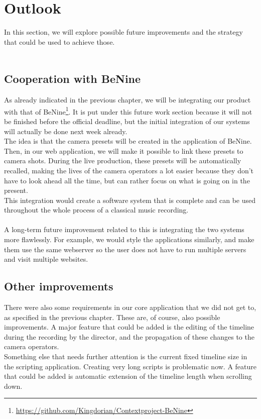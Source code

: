 \section{Outlook}

In this section, we will explore possible future improvements and the strategy that could be used to achieve those.\\\\

\subsection{Cooperation with BeNine}
As already indicated in the previous chapter, we will be integrating our product with that of BeNine\footnote{\url{https://github.com/Kingdorian/Contextproject-BeNine}}. It is put under this future work section because it will not be finished before the official deadline, but the initial integration of our systems will actually be done next week already.\\
The idea is that the camera presets will be created in the application of BeNine. Then, in our web application, we will make it possible to link these presets to camera shots. During the live production, these presets will be automatically recalled, making the lives of the camera operators a lot easier because they don't have to look ahead all the time, but can rather focus on what is going on in the present.\\
This integration would create a software system that is complete and can be used throughout the whole process of a classical music recording.\\\\
A long-term future improvement related to this is integrating the two systems more flawlessly. For example, we would style the applications similarly, and make them use the same webserver so the user does not have to run multiple servers and visit multiple websites.

\subsection{Other improvements}
There were also some requirements in our core application that we did not get to, as specified in the previous chapter. These are, of course, also possible improvements. A major feature that could be added is the editing of the timeline during the recording by the director, and the propagation of these changes to the camera operators.\\
Something else that needs further attention is the current fixed timeline size in the scripting application. Creating very long scripts is problematic now. A feature that could be added is automatic extension of the timeline length when scrolling down.



